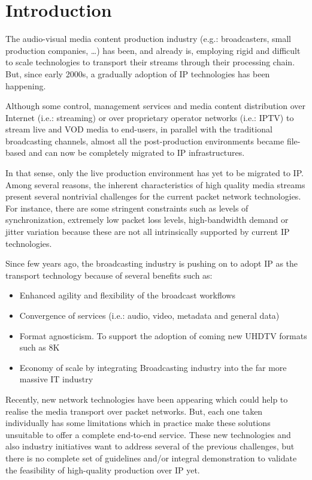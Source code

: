 \cleardoublepage
{}
\chapter*{Introduction}

The audio-visual media content production industry (e.g.: broadcasters, small production companies, \ldots) has been, and already is, employing rigid and difficult to scale technologies to transport their streams through their processing chain. But, since early 2000s, a gradually adoption of IP technologies has been happening.

Although some control, management services and media content distribution over Internet (i.e.: streaming) or over proprietary operator networks (i.e.: IPTV) to stream live and VOD media to end-users, in parallel with the traditional broadcasting channels, almost all the post-production environments became file-based and can now be completely migrated to IP infrastructures. 

In that sense, only the live production environment has yet to be migrated to IP. Among several reasons, the inherent characteristics of high quality media streams present several nontrivial challenges for the current packet network technologies. For instance, there are some stringent constraints such as levels of synchronization, extremely low packet loss levels, high-bandwidth demand or jitter variation because these are not all intrinsically supported by current IP technologies.

Since few years ago, the broadcasting industry is pushing on to adopt IP as the transport technology because of several benefits such as:

\begin{itemize}
  \item Enhanced agility and flexibility of the broadcast workflows
  \item Convergence of services (i.e.: audio, video, metadata and general data)
  \item Format agnosticism. To support the adoption of coming new UHDTV formats such as 8K 
  \item Economy of scale by integrating Broadcasting industry into the far more massive IT industry
\end{itemize}

Recently, new network technologies have been appearing which could help to realise the media transport over packet networks. But, each one taken individually has some limitations which in practice make these solutions unsuitable to offer a complete end-to-end service. These new technologies and also industry initiatives want to address several of the previous challenges, but there is no complete set of guidelines and/or integral demonstration to validate the feasibility of high-quality production over IP yet.

